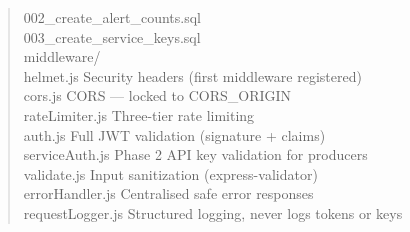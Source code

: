 \documentclass[11pt]{article}
\begin{document}
\begin{quote}
\hspace*{3em}002\_create\_alert\_counts.sql \\
\hspace*{3em}003\_create\_service\_keys.sql \\
\hspace*{1em}middleware/ \\
\hspace*{2em}helmet.js\hspace{2.5cm} Security headers (first middleware registered) \\
\hspace*{2em}cors.js\hspace{2.7cm} CORS --- locked to CORS\_ORIGIN \\
\hspace*{2em}rateLimiter.js\hspace{1.7cm} Three-tier rate limiting \\
\hspace*{2em}auth.js\hspace{2.7cm} Full JWT validation (signature + claims) \\
\hspace*{2em}serviceAuth.js\hspace{1.8cm} Phase 2 API key validation for producers \\
\hspace*{2em}validate.js\hspace{2.2cm} Input sanitization (express-validator) \\
\hspace*{2em}errorHandler.js\hspace{1.5cm} Centralised safe error responses \\
\hspace*{2em}requestLogger.js\hspace{1.2cm} Structured logging, never logs tokens or keys
\end{quote}
\end{document}
